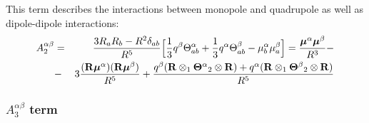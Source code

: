 \documentclass[a4paper,titlepage,twoside,fleqn]{article}
\newcommand{\BM}[1]{\ensuremath{\mbox{\boldmath${#1}$}}}
\begin{document}
This term describes the interactions between monopole 
and quadrupole as well as dipole-dipole interactions:
\begin{eqnarray}
A^{\alpha\beta}_2&=& \frac{3R_aR_b-R^2\delta_{ab}}{R^5} 
\Big[ 
    \frac{1}{3} {q}^{\beta} {\Theta}^{\alpha}_{ab} + 
    \frac{1}{3} {q}^{\alpha} {\Theta}^{\beta}_{ab} - 
    {\mu}_b^{\alpha} {\mu}_a^{\beta}  
\Big] = \frac{{\BM \mu}^{\alpha}{\BM \mu}^{\beta}}{R^3} - \\ \nonumber
&-& 
3\frac{({\bf R}{\BM \mu}^{\alpha})({\bf R}{\BM \mu}^{\beta})}{R^5} +
\frac{q^{\beta}({\bf R}\otimes_1{\bf\Theta}^{\alpha}{}_2\otimes{\bf R}) + q^{\alpha}({\bf R}\otimes_1{\bf\Theta}^{\beta}{}_2\otimes{\bf R})  }{R^5} 
\end{eqnarray}  

\subsubsection*{$A^{\alpha\beta}_3$ term}
\end{document}
